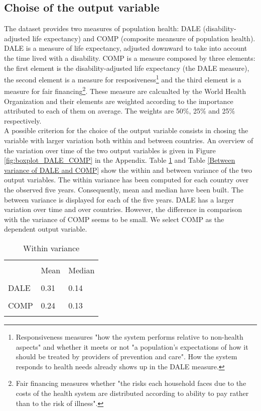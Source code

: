 \documentclass[12pt,a4paper]{article}\usepackage[]{graphicx}\usepackage[]{color}
\begin{document}
\subsection{Choise of the output variable}
The dataset provides two measures of population health: DALE (disability-adjusted life expectancy) and COMP (composite meansure of population health). DALE is a measure of life expectancy, adjusted downward to take into account the time lived with a disability. COMP is a measure composed by three elements: the first element is the disability-adjusted life expectancy (the DALE measure), the second element is a measure for resposiveness\footnote{Responsiveness measures "how the system performs relative to non-health aspects" and whether it meets or not "a population's expectations of how it should be treated by providers of prevention and care". How the system responds to health needs already shows up in the DALE measure.} and the third element is a measure for fair financing\footnote{Fair financing measures whether "the risks each household faces due to the costs of the health system are distributed according to ability to pay rather than to the risk of illness".}. These measure are calcualted by the World Health Organization and their elements are weighted according to the importance attributed to each of them on average. The weights are 50\%, 25\% and 25\% respectively. \\

A possible criterion for the choice of the output variable consists in chosing the variable with larger variation both within and between countries. An overview of the variation over time of the two output variables is given in Figure \ref{fig:boxplot_DALE_COMP} in the Appendix. Table \ref{Within variance of DALE and COMP} and Table \ref{Between variance of DALE and COMP} show the within and between variance of the two output variables. The within variance has been computed for each country over the observed five years. Consequently, mean and median have been built. The between variance is displayed for each of the five years. DALE has a larger variation over time and over countries. However, the difference in comparison with the variance of COMP seems to be small. We select COMP as the dependent output variable.



\begin{table}[htbp] \centering 
  \caption{Within variance} 
  \label{Within variance of DALE and COMP} 
  \normalsize
\begin{tabular}{p{5cm} p{1.5cm} p{1.5cm}} 
\\[-1.8ex]\hline 
\hline \\[-1.8ex] 
 & Mean & Median \\ 
\hline \\[-1.8ex] 
DALE & 0.31 & 0.14 \\
\hline \\[-1.8ex] 
COMP & 0.24 & 0.13 \\
\hline
\hline \\[-1.8ex] 
\end{tabular} 
\end{table} 
\end{document}

